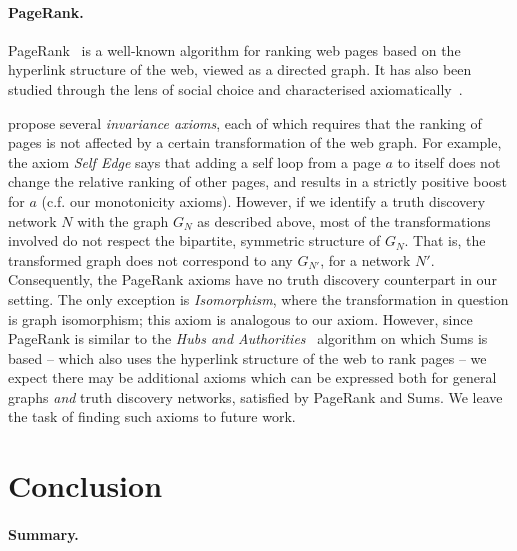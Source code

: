 \paragraph{PageRank.} PageRank~\cite{page_pagerank_1999} is a well-known
algorithm for ranking web pages based on the hyperlink structure of the web,
viewed as a directed graph. It has also been studied through the lens of social
choice and characterised
axiomatically~\cite{altman2005ranking,skibski_pagerank}.\footnotemark{}


\textcite{altman2005ranking} propose several \emph{invariance
axioms}, each of which requires that the ranking of pages is not affected by a
certain transformation of the web graph. For example, the axiom \emph{Self
Edge} says that adding a self loop from a page $a$ to itself does not change
the relative ranking of other pages, and results in a strictly positive boost
for $a$ (c.f. our monotonicity axioms). However, if we identify a truth
discovery network $N$ with the graph $G_N$ as described above, most of the
transformations involved do not respect the bipartite, symmetric structure of
$G_N$. That is, the transformed graph does not correspond to any $G_{N'}$, for
a network $N'$.  Consequently, the PageRank axioms have no truth discovery
counterpart in our setting. The only exception is \emph{Isomorphism}, where the
transformation in question is graph isomorphism; this axiom is analogous to our
\symmetry{} axiom. However, since PageRank is similar to the \emph{Hubs and
Authorities}~\cite{kleinberg1999} algorithm on which Sums is based -- which
also uses the hyperlink structure of the web to rank pages -- we expect there
may be additional axioms which can be expressed both for general graphs
\emph{and} truth discovery networks, satisfied by PageRank and Sums. We leave
the task of finding such axioms to future work.

\section{Conclusion}
\label{td_new_sec_conclusion}

\paragraph{Summary.}


